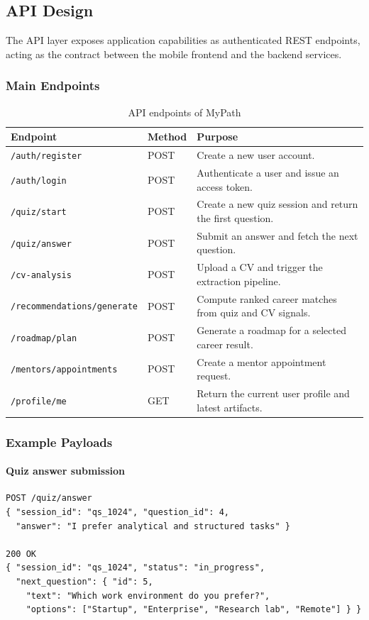 \documentclass[12pt,a4paper]{article}
\begin{document}
\subsection{API Design}

The API layer exposes application capabilities as authenticated REST endpoints, acting as the contract between the mobile frontend and the backend services.

\subsubsection{Main Endpoints}

\begin{table}[H]
\centering\small
\begin{tabular}{|p{4cm}|p{1.8cm}|p{8cm}|}
\hline
\textbf{Endpoint} & \textbf{Method} & \textbf{Purpose} \\
\hline
\texttt{/auth/register}            & POST & Create a new user account. \\
\texttt{/auth/login}               & POST & Authenticate a user and issue an access token. \\
\texttt{/quiz/start}               & POST & Create a new quiz session and return the first question. \\
\texttt{/quiz/answer}              & POST & Submit an answer and fetch the next question. \\
\texttt{/cv-analysis}              & POST & Upload a CV and trigger the extraction pipeline. \\
\texttt{/recommendations/generate} & POST & Compute ranked career matches from quiz and CV signals. \\
\texttt{/roadmap/plan}             & POST & Generate a roadmap for a selected career result. \\
\texttt{/mentors/appointments}     & POST & Create a mentor appointment request. \\
\texttt{/profile/me}               & GET  & Return the current user profile and latest artifacts. \\
\hline
\end{tabular}
\caption{API endpoints of MyPath}
\end{table}

\subsubsection{Example Payloads}

\paragraph{Quiz answer submission}
\begin{verbatim}
POST /quiz/answer
{ "session_id": "qs_1024", "question_id": 4,
  "answer": "I prefer analytical and structured tasks" }

200 OK
{ "session_id": "qs_1024", "status": "in_progress",
  "next_question": { "id": 5,
    "text": "Which work environment do you prefer?",
    "options": ["Startup", "Enterprise", "Research lab", "Remote"] } }
\end{verbatim}
\end{document}
